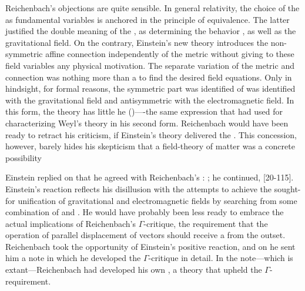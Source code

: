 \documentclass[draft]{article}
\newcommand{\WT}{Weyl's theory\xspace}
\begin{document}
Reichenbach's objections are quite sensible. In general relativity, the choice of the \gmn as fundamental variables is anchored in the principle of equivalence. The latter justified the double meaning of the \gmn, as determining the behavior \rac, as well as the gravitational field. On the contrary, Einstein's new theory introduces the non-symmetric affine connection \Gtmn independently of the metric \gmn without giving to these field variables any physical motivation. The separate variation of the metric and connection was nothing more than a  to find the desired field equations. Only in hindsight, for formal reasons, the symmetric part was identified of \gmn was identified with the gravitational field and antisymmetric with the electromagnetic field. In this form, the theory has little he  ()----the same expression that \citet[367]{Reichenbach1921} had used for characterizing \WT in his second form. Reichenbach would have been ready to retract his criticism, if Einstein's theory delivered the . This concession, however, barely hides his skepticism that a field-theory of matter was a concrete possibility 

Einstein replied on   that he agreed with Reichenbach's : ;  he continued,  [20-115]. Einstein's reaction reflects his disillusion with the attempts to achieve the sought-for unification of gravitational and electromagnetic fields by searching from some combination of \Gtmn and \gmn. He would have probably been less ready to embrace the actual implications of Reichenbach's $\Gamma$-critique, the requirement that the operation of parallel displacement of vectors should receive a  from the outset. Reichenbach took the opportunity of Einstein's positive reaction, and on  he sent him a note in which he developed the $\Gamma$-critique in detail. In the note---which is extant---Reichenbach had developed his own \uft, a theory that upheld the $\Gamma$-requirement.
\end{document}

